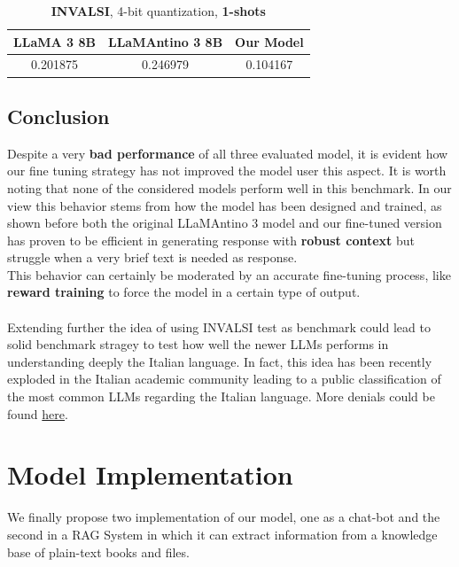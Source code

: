 \documentclass{article}
\begin{document}
	\begin{table}[h]
		\center
		\begin{tabular}{ccc}
			\toprule
			\textbf{LLaMA 3 8B} & \textbf{LLaMAntino 3 8B} & \textbf{Our Model} \\
			\midrule
			0.201875 & 0.246979 & 0.104167 \\
			\bottomrule
		\end{tabular}
		\caption{\textbf{INVALSI}, 4-bit quantization, \textbf{1-shots}}
	\end{table} 
	
	\subsection{Conclusion}
	Despite a very \textbf{bad performance} of all three evaluated model, it is evident how our fine tuning strategy has not improved the model user this aspect. It is worth noting that none of the considered models perform well in this benchmark.
	In our view this behavior stems from how the model has been designed and trained, as shown before both the original LLaMAntino 3 model and our fine-tuned version has proven to be efficient in generating response with \textbf{robust context} but struggle when a very brief text is needed as response. \\
	This behavior can certainly be moderated by an accurate fine-tuning process, like \textbf{reward training} to force the model in a certain type of output. \\\\
	Extending further the idea of using INVALSI test as benchmark could lead to solid benchmark stragey to test how well the newer LLMs performs in understanding deeply the Italian language. 
	In fact, this idea has been recently exploded in the Italian academic community leading to a public classification of the most common LLMs regarding the Italian language. More denials could be found \href{https://huggingface.co/spaces/Crisp-Unimib/INVALSIbenchmark}{here}.  
	
	
	\section{Model Implementation}
	We finally propose two implementation of our model, one as a chat-bot and the second in a RAG System in which it can extract information from a knowledge base of plain-text books and files. 
	
\end{document}
